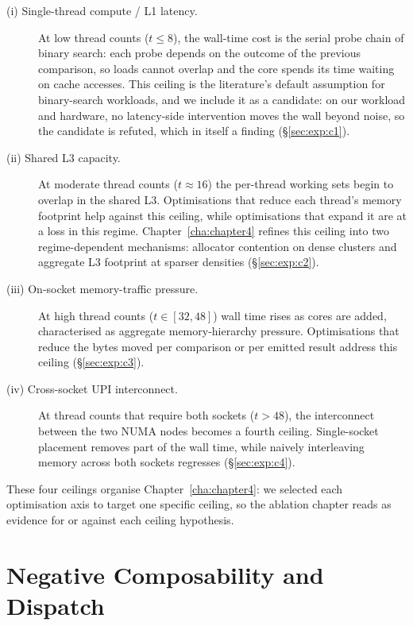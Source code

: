 \begin{description}
    \item[(i) Single-thread compute / L1 latency.] At low thread counts ($t \leq 8$), the wall-time cost is the serial probe chain of binary search: each probe depends on the outcome of the previous comparison, so loads cannot overlap and the core spends its time waiting on cache accesses. This ceiling is the literature's default assumption for binary-search workloads, and we include it as a candidate: on our workload and hardware, no latency-side intervention moves the wall beyond noise, so the candidate is refuted, which in itself a finding (§\ref{sec:exp:c1}).

    \item[(ii) Shared L3 capacity.] At moderate thread counts ($t \approx 16$) the per-thread working sets begin to overlap in the shared L3. Optimisations that reduce each thread's memory footprint help against this ceiling, while optimisations that expand it are at a loss in this regime. Chapter~\ref{cha:chapter4} refines this ceiling into two regime-dependent mechanisms: allocator contention on dense clusters and aggregate L3 footprint at sparser densities (§\ref{sec:exp:c2}).

    \item[(iii) On-socket memory-traffic pressure.]
    At high thread counts ($t \in [32, 48]$) wall time rises as cores are added, characterised as aggregate memory-hierarchy pressure. Optimisations that reduce the bytes moved per comparison or per emitted result address this ceiling (§\ref{sec:exp:c3}).

    \item[(iv) Cross-socket UPI interconnect.]
    At thread counts that require both sockets ($t > 48$), the interconnect between the two NUMA nodes becomes a fourth ceiling. Single-socket placement removes part of the wall time, while naively interleaving memory across both sockets regresses (§\ref{sec:exp:c4}).
    
\end{description}

These four ceilings organise Chapter~\ref{cha:chapter4}: we selected each optimisation axis to target one specific ceiling, so the ablation chapter reads as evidence for or against each ceiling hypothesis.

\section{Negative Composability and Dispatch\label{sec:negcomp}}
\label{sec:dispatch}

